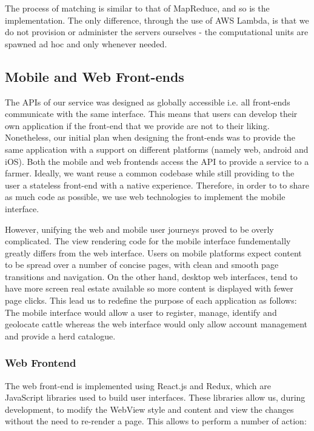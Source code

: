 The process of matching is similar to that of MapReduce, and so is the implementation. The only difference, through the use of AWS Lambda, is that we do not provision or administer the servers ourselves - the computational units are spawned ad hoc and only whenever needed.

\subsection{Mobile and Web Front-ends}

The APIs of our service was designed as globally accessible i.e. all front-ends communicate with the same interface. This means that users can develop their own application if the front-end that we provide are not to their liking. Nonetheless, our initial plan when designing the front-ends was to provide the same application with a support on different platforms (namely web, android and  iOS). Both the mobile and web frontends access the API to provide a service to a farmer. Ideally, we want reuse a common codebase while still providing to the user a stateless front-end with a native experience. Therefore, in order to to share as much code as possible, we use web technologies to implement the mobile interface.

However, unifying the web and mobile user journeys proved to be overly complicated. The view rendering code for the mobile interface fundementally greatly differs from the web interface. Users on mobile platforms expect content to be spread over a number of concise pages, with clean and smooth page transitions and navigation. On the other hand, desktop web interfaces, tend to have more screen real estate available so more content is displayed with fewer page clicks. This lead us to redefine the purpose of each application as follows: The mobile interface would allow a user to register, manage, identify and geolocate cattle whereas the web interface would only allow account management and provide a herd catalogue.

\subsubsection{Web Frontend}
The web front-end is implemented using React.js and Redux, which are JavaScript libraries used to build user interfaces. These libraries allow us, during development, to modify the WebView style and content and view the changes without the need to re-render a page. This allows to perform a number of action:

